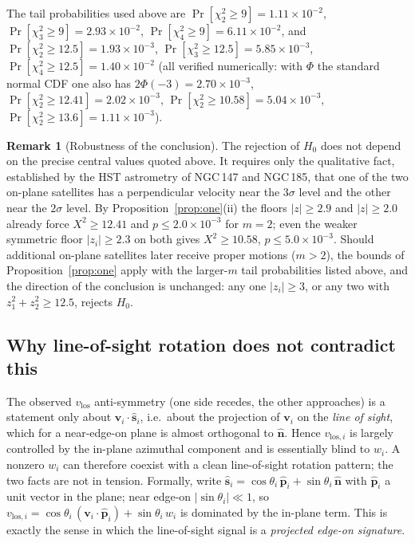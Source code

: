 \documentclass{amsart}
\theoremstyle{definition}
\newtheorem{remark}{Remark}
\begin{document}
The tail probabilities used above are
$\Pr[\chi^2_2\ge9]=1.11\times10^{-2}$,
$\Pr[\chi^2_3\ge9]=2.93\times10^{-2}$,
$\Pr[\chi^2_4\ge9]=6.11\times10^{-2}$, and
$\Pr[\chi^2_2\ge12.5]=1.93\times10^{-3}$,
$\Pr[\chi^2_3\ge12.5]=5.85\times10^{-3}$,
$\Pr[\chi^2_4\ge12.5]=1.40\times10^{-2}$ (all verified
numerically: with $\Phi$ the standard normal CDF one also has
$2\Phi(-3)=2.70\times10^{-3}$, $\Pr[\chi^2_2\ge12.41]=2.02\times10^{-3}$,
$\Pr[\chi^2_2\ge10.58]=5.04\times10^{-3}$,
$\Pr[\chi^2_2\ge13.6]=1.11\times10^{-3}$).

\begin{remark}[Robustness of the conclusion]\label{rem:robust}
The rejection of $H_0$ does not depend on the precise central values quoted
above. It requires only the qualitative fact, established by the HST
astrometry of NGC\,147 and NGC\,185, that one of the two on-plane satellites
has a perpendicular velocity near the $3\sigma$ level and the other near the
$2\sigma$ level. By Proposition~\ref{prop:one}(ii) the floors $|z|\ge 2.9$
and $|z|\ge 2.0$ already force $X^2\ge 12.41$ and $p\le 2.0\times10^{-3}$ for
$m=2$; even the weaker symmetric floor $|z_i|\ge 2.3$ on both gives
$X^2\ge 10.58$, $p\le 5.0\times10^{-3}$. Should additional on-plane
satellites later receive proper motions ($m>2$), the bounds of
Proposition~\ref{prop:one} apply with the larger-$m$ tail probabilities
listed above, and the direction of the conclusion is unchanged: any one
$|z_i|\ge 3$, or any two with $z_1^2+z_2^2\ge 12.5$, rejects $H_0$.
\end{remark}

\subsection{Why line-of-sight rotation does not contradict this}
The observed $v_{\mathrm{los}}$ anti-symmetry (one side recedes, the other
approaches) is a statement only about
$\bm v_i\cdot\hat{\bm s}_i$, i.e.\ about the projection of $\bm v_i$ on the
\emph{line of sight}, which for a near-edge-on plane is almost orthogonal to
$\hat{\bm n}$. Hence $v_{\mathrm{los},i}$ is largely controlled by the
in-plane azimuthal component and is essentially blind to $w_i$. A nonzero
$w_i$ can therefore coexist with a clean line-of-sight rotation pattern; the
two facts are not in tension. Formally, write
$\hat{\bm s}_i=\cos\theta_i\,\hat{\bm p}_i+\sin\theta_i\,\hat{\bm n}$ with
$\hat{\bm p}_i$ a unit vector in the plane; near edge-on $|\sin\theta_i|\ll1$,
so
$v_{\mathrm{los},i}=\cos\theta_i\,(\bm v_i\cdot\hat{\bm p}_i)
+\sin\theta_i\,w_i$ is dominated by the in-plane term. This is exactly the
sense in which the line-of-sight signal is a \emph{projected edge-on
signature}.
\end{document}
